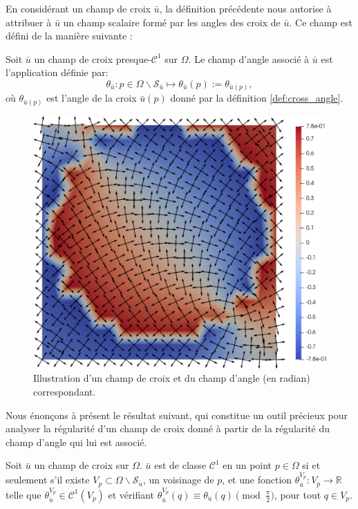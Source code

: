
En considérant un champ de croix $\bar{u}$, la définition précédente nous autorise à attribuer à $\bar{u}$ un champ scalaire formé par les angles des croix de $\bar{u}$. Ce champ est défini de la manière suivante :

\begin{definition}
    Soit $\bar{u}$ un champ de croix presque-$\mathcal{C}^1$ sur $\Omega$. Le champ d'angle associé à $\bar{u}$ est l'application définie par:
    $$\theta_{\bar{u}}:p\in\Omega\backslash\mathcal{S}_{\bar{u}}\longmapsto\theta_{\bar{u}}(p):=\theta_{\bar{u}(p)},$$
    où $\theta_{\bar{u}(p)}$ est l'angle de la croix $\bar{u}(p)$ donné par la définition \ref{def:cross_angle}.
\end{definition}

\begin{figure}[!h]
  \centering
  \includegraphics[scale=0.32]{images/cross_ang_field.pdf}
  \caption{Illustration d'un champ de croix et du champ d'angle (en radian) correspondant.}
  \label{fig:cross_field}
\end{figure}


Nous énonçons à présent le résultat suivant, qui constitue un outil précieux pour analyser la régularité d'un champ de croix donné à partir de la régularité du champ d'angle qui lui est associé.

\begin{proposition}
    \label{prop:angular_cont}
    Soit $\bar{u}$ un champ de croix sur $\Omega$. $\bar{u}$ est de classe $\mathcal{C}^1$ en un point $p\in\Omega$ si et seulement s'il existe $V_p\subset \Omega \backslash \mathcal{S}_{\bar{u}}$, un voisinage de $p$, et une fonction $\theta_{\bar{u}}^{V_p}:V_p \rightarrow \mathbb{R}$ telle que $\theta_{\bar{u}}^{V_p}\in \mathcal{C}^1(V_p)$ et vérifiant $\theta_{\bar{u}}^{V_p}(q)\equiv\theta_{\bar{u}}(q) \pmod{\frac{\pi}{2}}$, pour tout $q\in V_p$.
\end{proposition}


